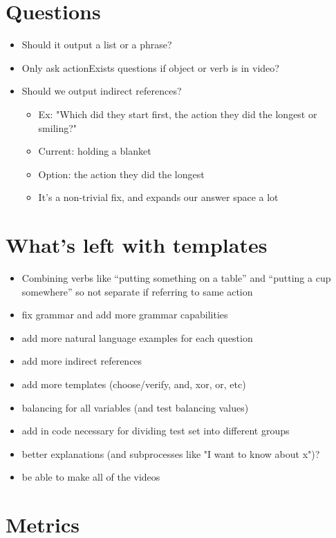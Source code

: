 \documentclass{article}
\begin{document}
\section{Questions}

\begin{itemize}
  \item Should it output a list or a phrase?
  \item Only ask actionExists questions if object or verb is in video?
  \item Should we output indirect references? 
  \begin{itemize}
      \item Ex: "Which did they start first, the action they did the longest or smiling?" 
      \item Current: holding a blanket
      \item Option:  the action they did the longest
      \item It's a non-trivial fix, and expands our answer space a lot 
  \end{itemize}
\end{itemize}


\section{What's left with templates}
\begin{itemize}
    \item Combining  verbs like “putting something on a table” and “putting a cup somewhere” so not separate if referring to same action
    \item fix grammar and add more grammar capabilities
    \item add more natural language examples for each question
    \item add more indirect references
    \item add more templates (choose/verify, and, xor, or, etc)
    \item balancing for all variables (and test balancing values)
    \item add in code necessary for dividing test set into different groups
    \item better explanations (and subprocesses like "I want to know about x")?
    \item be able to make all of the videos
\end{itemize}

\section{Metrics}
\setlength\LTleft{-1in}
\setlength\LTright{-1in}
\end{document}
